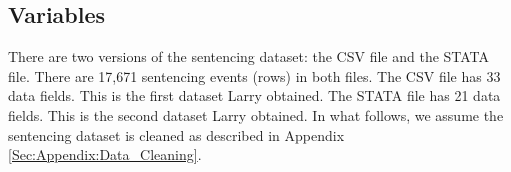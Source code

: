 \documentclass[11pt, oneside]{article}   	%
\theoremstyle{ModifiedStyle}
\begin{document}

  \subsection{Variables}
  	There are two versions of the sentencing dataset: the CSV file and the STATA file. There are 17,671 sentencing events (rows) in both files. The CSV file has 33 data fields. This is the first dataset Larry obtained. The STATA file has 21 data fields. This is the second dataset Larry obtained. In what follows, we assume the sentencing dataset is cleaned as described in Appendix \ref{Sec:Appendix:Data_Cleaning}.
\end{document}
